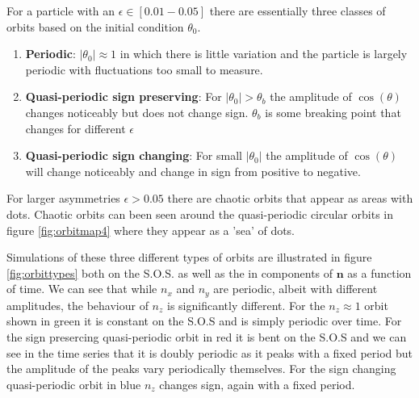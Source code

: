 For a particle with an $\epsilon \in \left[0.01-0.05\right]$ there are essentially three classes of orbits based on the initial condition $\theta_0$.

\begin{enumerate}
\item \textbf{Periodic}: $\left|\theta_0\right| \approx 1$ in which there is little variation and the particle is largely periodic with fluctuations too small to measure.
\item \textbf{Quasi-periodic sign preserving}: For $\left|\theta_0\right|> \theta_b$ the amplitude of $\cos(\theta)$ changes noticeably but does not change sign. $\theta_b$ is some breaking point that changes for different $\epsilon$
\item \textbf{Quasi-periodic sign changing}: For small $\left|\theta_0\right|$ the amplitude of $\cos(\theta)$ will change noticeably and change in sign from positive to negative.
\end{enumerate}

For larger asymmetries $\epsilon > 0.05$ there are chaotic orbits that appear as areas with dots. Chaotic orbits can been seen around the quasi-periodic circular orbits in figure \ref{fig:orbitmap4} where they appear as a 'sea' of dots.

Simulations of these three different types of orbits are illustrated in figure \ref{fig:orbittypes} both on the S.O.S. as well as the in components of $\mathbf{n}$ as a function of time. We can see that while $n_x$ and $n_y$ are periodic, albeit with different amplitudes, the 
behaviour of $n_z$ is significantly different. For the $n_z \approx 1$  orbit shown in green it is constant on the S.O.S and is simply periodic over time. For the sign presercing quasi-periodic orbit in red it is bent on the S.O.S and we can see in the time series that it is doubly periodic as it peaks with a fixed period but the amplitude of the peaks vary periodically themselves. For the sign changing quasi-periodic orbit in blue $n_z$ changes sign, again with a fixed period.




